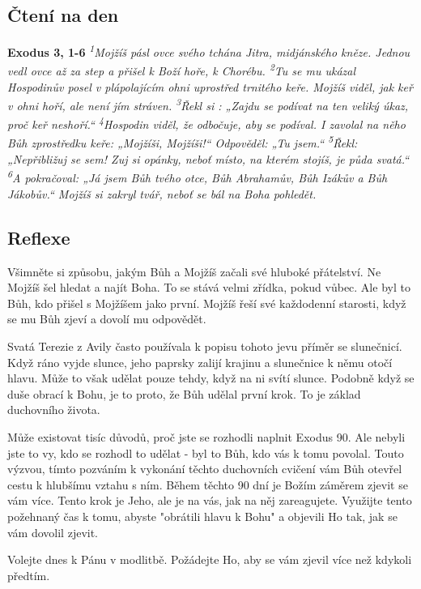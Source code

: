 \documentclass[11pt]{article}
\begin{document}
\subsection*{Čtení na den}
\textbf{Exodus 3, 1-6}
\newline
\textit{\textsuperscript{1}Mojžíš pásl ovce svého tchána Jitra, midjánského kněze. Jednou vedl ovce až za step a přišel k Boží hoře, k Chorébu.
\textsuperscript{2}Tu se mu ukázal Hospodinův posel v plápolajícím ohni uprostřed trnitého keře. Mojžíš viděl, jak keř v ohni hoří, ale není jím stráven.
\textsuperscript{3}Řekl si : „Zajdu se podívat na ten veliký úkaz, proč keř neshoří.“
\textsuperscript{4}Hospodin viděl, že odbočuje, aby se podíval. I zavolal na něho Bůh zprostředku keře: „Mojžíši, Mojžíši!“ Odpověděl: „Tu jsem.“
\textsuperscript{5}Řekl: „Nepřibližuj se sem! Zuj si opánky, neboť místo, na kterém stojíš, je půda svatá.“
\textsuperscript{6}A pokračoval: „Já jsem Bůh tvého otce, Bůh Abrahamův, Bůh Izákův a Bůh Jákobův.“ Mojžíš si zakryl tvář, neboť se bál na Boha pohledět.
}

\subsection*{Reflexe}

Všimněte si způsobu, jakým Bůh a Mojžíš začali své hluboké přátelství. Ne Mojžíš šel hledat a najít Boha. To se stává velmi zřídka, pokud vůbec. Ale byl to Bůh, kdo přišel s Mojžíšem jako první.  Mojžíš řeší své každodenní starosti, když se mu Bůh zjeví a dovolí mu odpovědět.  

Svatá Terezie z Avily často používala k popisu tohoto jevu příměr se slunečnicí. Když ráno vyjde slunce, jeho paprsky zalijí krajinu a slunečnice k němu otočí hlavu. Může to však udělat pouze tehdy, když na ni svítí slunce. Podobně když se duše obrací k Bohu, je to proto, že Bůh udělal první krok. To je základ duchovního života.

Může existovat tisíc důvodů, proč jste se rozhodli naplnit Exodus 90. Ale nebyli jste to vy, kdo se rozhodl to udělat - byl to Bůh, kdo vás k tomu povolal. Touto výzvou, tímto pozváním k vykonání těchto duchovních cvičení vám Bůh otevřel cestu k hlubšímu vztahu s ním. Během těchto 90 dní je Božím záměrem zjevit se vám více. Tento krok je Jeho, ale je na vás, jak na něj zareagujete. Využijte tento požehnaný čas k tomu, abyste "obrátili hlavu k Bohu" a objevili Ho tak, jak se vám dovolil zjevit.

Volejte dnes k Pánu v modlitbě. Požádejte Ho, aby se vám zjevil více než kdykoli předtím.
\end{document}
